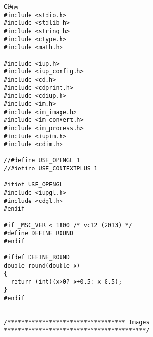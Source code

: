 \documentclass{ctexart}
\begin{document}
\lstset{language=C}
\begin{lstlisting}
C语言
#include <stdio.h>
#include <stdlib.h>
#include <string.h>
#include <ctype.h>
#include <math.h>

#include <iup.h>
#include <iup_config.h>
#include <cd.h>
#include <cdprint.h>
#include <cdiup.h>
#include <im.h>
#include <im_image.h>
#include <im_convert.h>
#include <im_process.h>
#include <iupim.h>
#include <cdim.h>

//#define USE_OPENGL 1
//#define USE_CONTEXTPLUS 1

#ifdef USE_OPENGL
#include <iupgl.h>
#include <cdgl.h>
#endif

#if _MSC_VER < 1800 /* vc12 (2013) */
#define DEFINE_ROUND
#endif

#ifdef DEFINE_ROUND
double round(double x)
{
  return (int)(x>0? x+0.5: x-0.5);
}
#endif


/********************************** Images *****************************************/



\end{lstlisting}
\end{document}
